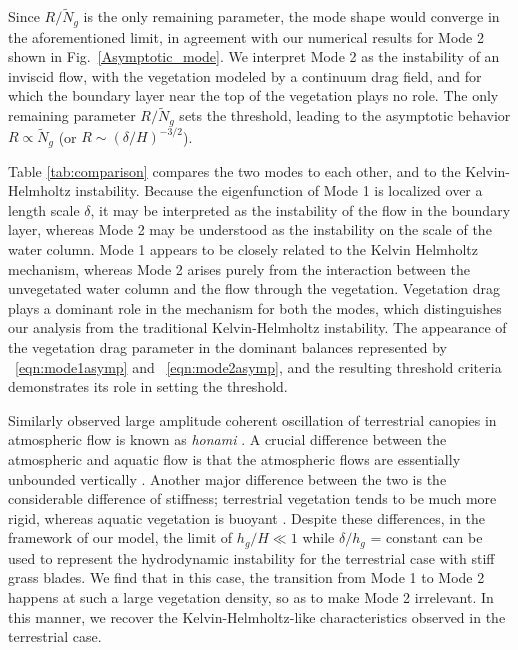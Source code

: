 \documentclass[aps,prl,twocolumn,superscriptaddress,sort&compress,10pt]{revtex4-1}  %
\newcommand{\hg}{h_g}
\newcommand{\Rey}{{R}}
\newcommand{\Ndg}{\tilde{N}_g}
\begin{document}
Since $\Rey/\Ndg$ is the only remaining parameter, the mode shape would converge in the aforementioned limit, in agreement with our numerical results for Mode 2 shown in Fig.~\ref{Asymptotic_mode}. 
We interpret Mode 2 as the instability of an inviscid flow, with the vegetation modeled by a continuum drag field, and for which the boundary layer near the top of the vegetation plays no role. The only remaining parameter $\Rey/\Ndg$ 
sets the threshold, leading to the asymptotic behavior $\Rey \propto \Ndg$ (or $\Rey \sim ({\delta}/{H})^{-3/2}$).

Table \ref{tab:comparison} compares the two modes to each other, and to the Kelvin-Helmholtz instability. 
Because the eigenfunction of Mode 1 is localized over a length scale $\delta$, it may be interpreted as the instability of the flow in the boundary layer, whereas Mode 2 may be understood as the instability on the scale of the water column. 
Mode 1 appears to be closely related to the Kelvin Helmholtz mechanism, whereas Mode 2 arises purely from the interaction between the unvegetated water column and the flow through the vegetation. 
Vegetation drag plays a dominant role in the mechanism for both the modes, which distinguishes our analysis from the traditional Kelvin-Helmholtz instability. 
The appearance of the vegetation drag parameter in the dominant balances represented by ~\eqref{eqn:mode1asymp} and ~\eqref{eqn:mode2asymp}, and the resulting threshold criteria demonstrates its role in setting the threshold.

Similarly observed large amplitude coherent oscillation of terrestrial canopies in atmospheric flow is known as \textit{honami} \cite{Inoue56,Raupach96}.
A crucial difference between the atmospheric and aquatic flow is that the atmospheric flows are essentially unbounded vertically \cite{Vivoni98,Nepf00}. 
Another major difference between the two is the considerable difference of stiffness; terrestrial vegetation tends to be much more rigid, whereas aquatic vegetation is buoyant \cite{Vivoni98,Ghisal02}. 
Despite these differences, in the framework of our model, the limit of $\hg/H \ll 1$ while $\delta/\hg$ = constant can be used to represent the hydrodynamic instability for the terrestrial case with stiff grass blades. We find that in this case, the transition from Mode 1 to Mode 2 happens at such a large vegetation density, so as to make Mode 2 irrelevant. In this manner, we recover the Kelvin-Helmholtz-like characteristics observed in the terrestrial case. 
\end{document}
